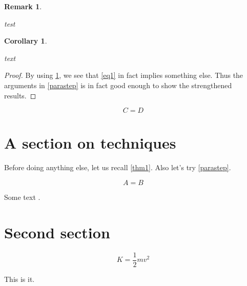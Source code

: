 \documentclass[amssymb,amsfonts]{amsart}
\makeatletter
\newtheorem{cor}[equation]{Corollary}
\newtheorem{rmk}[equation]{Remark}
\newenvironment{pfof}[1]%
	{\def\wwwnotes@pfofctr{#1}\begin{proof}}%
	{\end{proof}}
\makeatother
\begin{document}
\begin{rmk}\label{rmk1}
	\lipsum[27]

	test
\end{rmk}

\begin{cor}\label{cor1}
	\lipsum[24]

	text
\end{cor}

\begin{pfof}{cor1}
	By using \ref{rmk1}, we see that \ref{eq1} in fact implies something else. Thus the arguments in \ref{parastep} is in fact good enough to show the strengthened results. 
\end{pfof}

\begin{equation}
	C = D
\end{equation}

\section{A section on techniques}

Before doing anything else, let us recall \ref{thm1}. Also let's try \ref{parastep}.

\lipsum[2]

\begin{equation}
	A = B
\end{equation}

\lipsum[3-8]




\lipsum[5-9]

Some text \cite{Wong2009}.


\section{Second section}


\lipsum[10-23]

\begin{equation}
K = \frac12 mv^2
\end{equation}

This is it.




\end{document}
